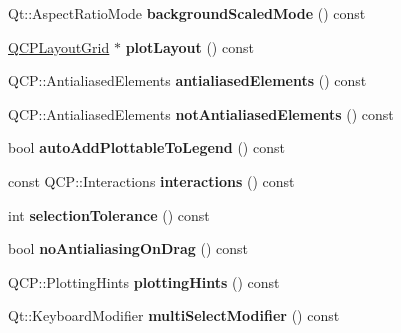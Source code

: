 \begin{DoxyCompactItemize}
\item 
Qt\+::\+Aspect\+Ratio\+Mode {\bfseries background\+Scaled\+Mode} () const \hypertarget{class_q_custom_plot_a3394512baf54fbcdc7613ac44a07c3b6}{}\label{class_q_custom_plot_a3394512baf54fbcdc7613ac44a07c3b6}

\item 
\hyperlink{class_q_c_p_layout_grid}{Q\+C\+P\+Layout\+Grid} $\ast$ {\bfseries plot\+Layout} () const \hypertarget{class_q_custom_plot_ab12cf82bdc088f25f75fa6c4ead09fcc}{}\label{class_q_custom_plot_ab12cf82bdc088f25f75fa6c4ead09fcc}

\item 
Q\+C\+P\+::\+Antialiased\+Elements {\bfseries antialiased\+Elements} () const \hypertarget{class_q_custom_plot_a81e954fbb485bb44c609e5707f0067b3}{}\label{class_q_custom_plot_a81e954fbb485bb44c609e5707f0067b3}

\item 
Q\+C\+P\+::\+Antialiased\+Elements {\bfseries not\+Antialiased\+Elements} () const \hypertarget{class_q_custom_plot_a8060cee59757213764382a78d3196189}{}\label{class_q_custom_plot_a8060cee59757213764382a78d3196189}

\item 
bool {\bfseries auto\+Add\+Plottable\+To\+Legend} () const \hypertarget{class_q_custom_plot_ad1599fc3fd1833b5988f6b89c1f616ca}{}\label{class_q_custom_plot_ad1599fc3fd1833b5988f6b89c1f616ca}

\item 
const Q\+C\+P\+::\+Interactions {\bfseries interactions} () const \hypertarget{class_q_custom_plot_a12401c02b6949a717f5749bb28c62983}{}\label{class_q_custom_plot_a12401c02b6949a717f5749bb28c62983}

\item 
int {\bfseries selection\+Tolerance} () const \hypertarget{class_q_custom_plot_a7b738074c75e80070ef6a10263c6cd69}{}\label{class_q_custom_plot_a7b738074c75e80070ef6a10263c6cd69}

\item 
bool {\bfseries no\+Antialiasing\+On\+Drag} () const \hypertarget{class_q_custom_plot_ae07f2895a34d13a97a10cae4d8e17a36}{}\label{class_q_custom_plot_ae07f2895a34d13a97a10cae4d8e17a36}

\item 
Q\+C\+P\+::\+Plotting\+Hints {\bfseries plotting\+Hints} () const \hypertarget{class_q_custom_plot_a130b55e205697a5288081e9fc11e443e}{}\label{class_q_custom_plot_a130b55e205697a5288081e9fc11e443e}

\item 
Qt\+::\+Keyboard\+Modifier {\bfseries multi\+Select\+Modifier} () const \hypertarget{class_q_custom_plot_a9b6b1a0fea8da3fda6d5e3d687202877}{}\label{class_q_custom_plot_a9b6b1a0fea8da3fda6d5e3d687202877}


\end{DoxyCompactItemize}
